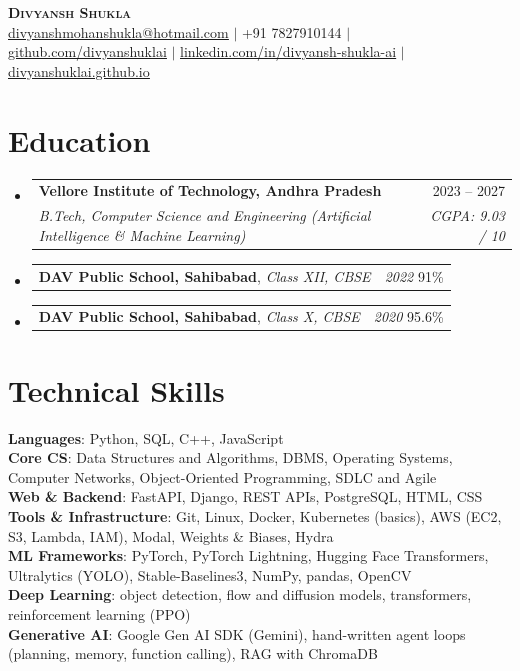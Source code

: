 \documentclass[letterpaper,11pt]{article}
\makeatletter
\newcommand{\graddate}{2023 -- 2027}
\newcommand{\resumeSubheading}[4]{
  \vspace{-2pt}\item
    \begin{tabular*}{0.97\textwidth}[t]{l@{\extracolsep{\fill}}r}
      \textbf{#1} & #2 \\
      \textit{\small#3} & \textit{\small #4} \\
    \end{tabular*}\vspace{-8pt}
}
\newcommand{\resumeEduLine}[4]{
  \vspace{1pt}\item
    \begin{tabular*}{0.97\textwidth}[t]{l@{\extracolsep{\fill}}r}
      \textbf{#1}, \textit{\small#2} & \textit{\small#3} \hspace{6pt} #4 \\
    \end{tabular*}\vspace{-8pt}
}
\newcommand{\resumeSubHeadingListStart}{\begin{itemize}[leftmargin=0.15in, label={}, itemsep=0pt]}
\newcommand{\resumeSubHeadingListEnd}{\end{itemize}\vspace{-11pt}}
\makeatother
\begin{document}
\begin{center}
    \textbf{\Huge \scshape Divyansh Shukla} \\ \vspace{2pt}
    \scriptsize
    \href{mailto:divyanshmohanshukla@hotmail.com}{\uline{divyanshmohanshukla@hotmail.com}} $|$
    +91 7827910144 $|$
    \href{https://github.com/divyanshuklai}{\uline{github.com/divyanshuklai}} $|$
    \href{https://www.linkedin.com/in/divyansh-shukla-ai/}{\uline{linkedin.com/in/divyansh-shukla-ai}} $|$
    \href{https://divyanshuklai.github.io}{\uline{divyanshuklai.github.io}}
\end{center}

\section{Education}
  \resumeSubHeadingListStart
    \resumeSubheading
      {Vellore Institute of Technology, Andhra Pradesh}{\graddate}
      {B.Tech, Computer Science and Engineering (Artificial Intelligence \& Machine Learning)}{CGPA: 9.03 / 10}
    \resumeEduLine{DAV Public School, Sahibabad}{Class XII, CBSE}{2022}{91\%}
    \resumeEduLine{DAV Public School, Sahibabad}{Class X, CBSE}{2020}{95.6\%}
    \vspace{3pt}
  \resumeSubHeadingListEnd

\section{Technical Skills}
 \begin{itemize}[leftmargin=0.15in, label={}]
    \small{\item{
     \textbf{Languages}{: Python, SQL, C++, JavaScript} \\
     \textbf{Core CS}{: Data Structures and Algorithms, DBMS, Operating Systems, Computer Networks, Object-Oriented Programming, SDLC and Agile} \\
     \textbf{Web \& Backend}{: FastAPI, Django, REST APIs, PostgreSQL, HTML, CSS} \\
     \textbf{Tools \& Infrastructure}{: Git, Linux, Docker, Kubernetes (basics), AWS (EC2, S3, Lambda, IAM), Modal, Weights \& Biases, Hydra} \\
     \textbf{ML Frameworks}{: PyTorch, PyTorch Lightning, Hugging Face Transformers, Ultralytics (YOLO), Stable-Baselines3, NumPy, pandas, OpenCV} \\
     \textbf{Deep Learning}{: object detection, flow and diffusion models, transformers, reinforcement learning (PPO)} \\
     \textbf{Generative AI}{: Google Gen AI SDK (Gemini), hand-written agent loops (planning, memory, function calling), RAG with ChromaDB}
    }}
 \end{itemize}
\end{document}
